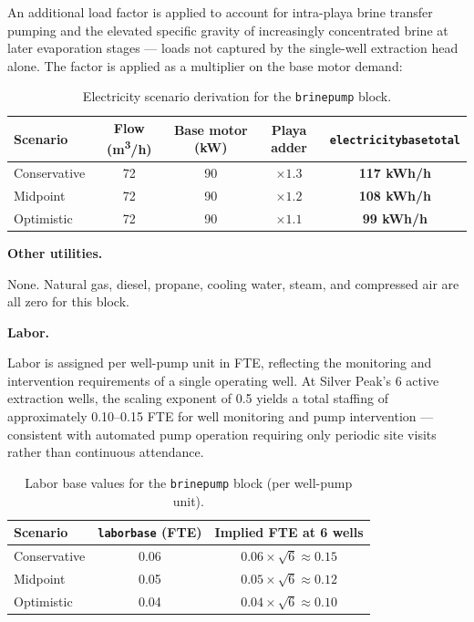 \documentclass{article}
\renewcommand\_{\textunderscore\allowbreak}
\begin{document}
An additional load factor is applied to account for intra-playa brine transfer pumping and the elevated specific gravity of increasingly concentrated brine at later evaporation stages --- loads not captured by the single-well extraction head alone. The factor is applied as a multiplier on the base motor demand:

\begin{table}[h!]
\caption{Electricity scenario derivation for the \texttt{brine\_pump} block.}
\centering
\begin{tabular}{lcccc}
\toprule
\textbf{Scenario} & \textbf{Flow (\si{m^3/h})} & \textbf{Base motor (kW)} & \textbf{Playa adder} & \texttt{electricity\_base\_total} \\
\midrule
Conservative & 72 & 90 & $\times 1.3$ & \textbf{117 kWh/h} \\
Midpoint     & 72 & 90 & $\times 1.2$ & \textbf{108 kWh/h} \\
Optimistic   & 72 & 90 & $\times 1.1$ & \textbf{99 kWh/h}  \\
\bottomrule
\end{tabular}
\end{table}

\medskip
\noindent\textbf{Other utilities.}\quad

None. Natural gas, diesel, propane, cooling water, steam, and compressed air are all zero for this block.

\medskip
\noindent\textbf{Labor.}\quad

Labor is assigned per well-pump unit in FTE, reflecting the monitoring and intervention requirements of a single operating well. At Silver Peak's 6 active extraction wells, the scaling exponent of 0.5 yields a total staffing of approximately 0.10--0.15 FTE for well monitoring and pump intervention --- consistent with automated pump operation requiring only periodic site visits rather than continuous attendance.

\begin{table}[h!]
\caption{Labor base values for the \texttt{brine\_pump} block (per well-pump unit).}
\centering
\begin{tabular}{lcc}
\toprule
\textbf{Scenario} & \texttt{labor\_base} (FTE) & \textbf{Implied FTE at 6 wells} \\
\midrule
Conservative & 0.06 & $0.06 \times \sqrt{6} \approx 0.15$ \\
Midpoint     & 0.05 & $0.05 \times \sqrt{6} \approx 0.12$ \\
Optimistic   & 0.04 & $0.04 \times \sqrt{6} \approx 0.10$ \\
\bottomrule
\end{tabular}
\end{table}
\end{document}
